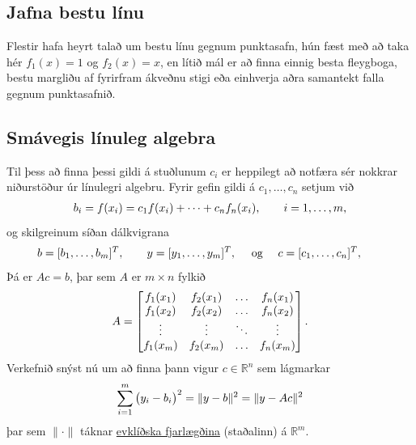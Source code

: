 \documentclass[A4paper,10pt,icelandic]{sphinxmanual}
\begin{document}

\subsection{Jafna bestu línu}
\label{kafli03:jafna-bestu-linu}\label{kafli03:index-24}
Flestir hafa heyrt talað um bestu línu gegnum punktasafn, hún fæst með
að taka hér \(f_1(x) = 1\) og \(f_2(x) = x\), en lítið mál er að
finna einnig besta fleygboga, bestu margliðu af fyrirfram ákveðnu stigi
eða einhverja aðra samantekt falla gegnum punktasafnið.


\subsection{Smávegis línuleg algebra}
\label{kafli03:smavegis-linuleg-algebra}
Til þess að finna þessi gildi á stuðlunum \(c_i\) er heppilegt að
notfæra sér nokkrar niðurstöður úr línulegri algebru. Fyrir gefin gildi
á \(c_1,\dots,c_n\) setjum við
\begin{gather}
\begin{split}b_i = f(x_i) = c_1f(x_i) + \cdots + c_n f_n(x_i),
    \qquad i=1,\dots,m,\end{split}\notag
\end{gather}
og skilgreinum síðan dálkvigrana
\begin{gather}
\begin{split}b = [b_1,\dots,b_m]^T,\qquad
    y = [y_1,\dots,y_m]^T,\quad \text{ og } \quad
    c = [c_1,\dots,c_n]^T,\qquad\end{split}\notag
\end{gather}
Þá er \(Ac=b\), þar sem \(A\) er \(m\times n\) fylkið
\begin{gather}
\begin{split}A = \left[\begin{matrix}
        f_1(x_1)& f_2(x_1) & \dots & f_n(x_1) \\
        f_1(x_2)& f_2(x_2) & \dots & f_n(x_2) \\
        \vdots &\vdots &\ddots &\vdots \\
        f_1(x_m)& f_2(x_m) & \dots & f_n(x_m)
    \end{matrix}\right].\end{split}\notag
\end{gather}
Verkefnið snýst nú um að finna þann vigur \(c\in {{\mathbb  R}}^n\)
sem lágmarkar
\begin{gather}
\begin{split}\sum_{i=1}^m \big(y_i-b_i\big)^2
    = \| y - b \|^2 = \| y - Ac \|^2\end{split}\notag
\end{gather}
þar sem \(\|\cdot\|\) táknar \href{https://en.wikipedia.org/wiki/Euclidean\_distance}{evklíðska fjarlægðina}
(staðalinn) á \({{\mathbb  R}}^m\).
\end{document}
